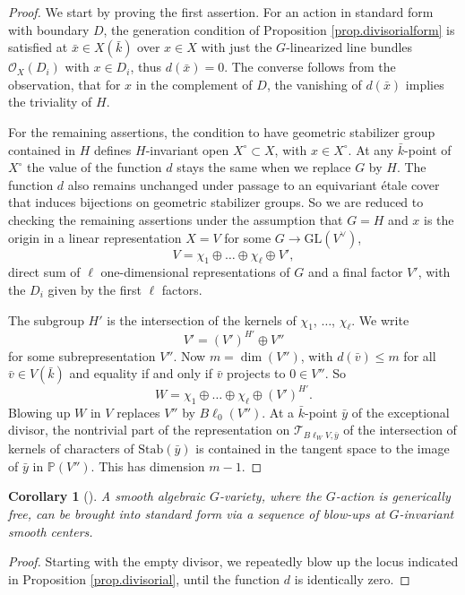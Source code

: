 \documentclass[12pt,reqno]{amsart}
\theoremstyle{plain}
\newtheorem{coro}[prop]{Corollary}
\theoremstyle{remark}
\theoremstyle{definition}
\numberwithin{equation}{section}
\newcommand{\bP}{{\mathbb P}}
\newcommand{\cO}{{\mathcal O}}
\newcommand{\GL}{{\mathrm{GL}}}
\begin{document}
\begin{proof}
We start by proving the first assertion.
For an action in standard form with boundary $D$, the generation condition of Proposition \ref{prop.divisorialform} is satisfied at $\bar x\in X(\bar k)$
over $x\in X$ with just the $G$-linearized line bundles $\cO_X(D_i)$ with $x\in D_i$,
thus $d(\bar x)=0$.
The converse follows from the observation, that for $x$ in the complement of $D$, the vanishing of $d(\bar x)$ implies the triviality of $H$.

For the remaining assertions, the condition to have geometric stabilizer group contained in $H$ defines $H$-invariant open $X^\circ\subset X$, with $x\in X^\circ$.
At any $\bar k$-point of $X^\circ$ the value of the function $d$ stays the same when we replace $G$ by $H$.
The function $d$ also remains unchanged under passage to an equivariant \'etale cover that induces bijections on geometric stabilizer groups.
So we are reduced to checking the remaining assertions under the assumption that
$G=H$ and
$x$ is the origin in a linear representation $X=V$ for some $G\to \GL(V^\vee)$,
\[ V=\chi_1\oplus\dots\oplus \chi_\ell\oplus V', \]
direct sum of $\ell$ one-dimensional representations of $G$
and a final factor $V'$, with
the $D_i$ given by the first $\ell$ factors.

The subgroup $H'$ is
the intersection of the kernels of $\chi_1$, $\dots$, $\chi_\ell$.
We write
\[ V'=(V')^{H'}\oplus V'' \]
for some subrepresentation $V''$.
Now $m=\dim(V'')$, with
$d(\bar v)\le m$ for all $\bar v\in V(\bar k)$ and equality if and only if $\bar v$ projects to $0\in V''$.
So
\[ W=\chi_1\oplus \dots\oplus \chi_\ell \oplus (V')^{H'}. \]
Blowing up $W$ in $V$ replaces $V''$ by
$B\ell_0(V'')$.
At a $\bar k$-point $\bar y$ of the exceptional divisor,
the nontrivial part of the representation on $\mathcal{T}_{B\ell_WV,\bar y}$ of the intersection of kernels of characters of $\mathrm{Stab}(\bar y)$ is contained in the tangent space to the image of $\bar y$ in $\bP(V'')$.
This has dimension $m-1$.
\end{proof}

\begin{coro}[\cite{berghrydh}]
\label{cor.divisorial}
A smooth algebraic $G$-variety, where the $G$-action is generically free, can be brought into standard form via a sequence of blow-ups at $G$-invariant smooth centers.
\end{coro}

\begin{proof}
Starting with the empty divisor, we repeatedly blow up the locus indicated in Proposition \ref{prop.divisorial}, until the function $d$ is identically zero.
\end{proof}
\end{document}
